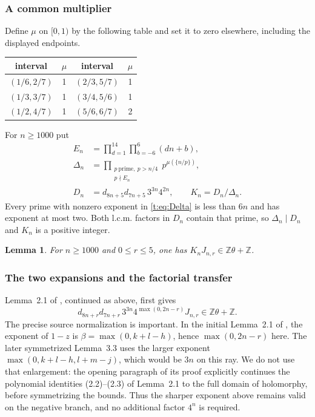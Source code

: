 \documentclass[11pt]{amsart}
\newcommand{\Z}{\mathbb Z}
\theoremstyle{plain}
\newtheorem{lemma}[theorem]{Lemma}
\theoremstyle{remark}\newtheorem{remark}[theorem]{Remark}
\numberwithin{equation}{section}
\begin{document}
\subsubsection{A common multiplier}
Define $\mu$ on $[0,1)$ by the following table and set it to zero elsewhere,
including the displayed endpoints.
\begin{center}
\begin{tabular}{cc@{\qquad}cc}
\toprule
interval & $\mu$ & interval & $\mu$\\
\midrule
$(1/6,2/7)$&1&$(2/3,5/7)$&1\\
$(1/3,3/7)$&1&$(3/4,5/6)$&1\\
$(1/2,4/7)$&1&$(5/6,6/7)$&2\\
\bottomrule
\end{tabular}
\end{center}
For $n\ge1000$ put
\begin{align}
 E_n&=\prod_{d=1}^{14}\prod_{b=-6}^{6}(dn+b),\label{t:eq:E}\\
 \Delta_n&=\prod_{\substack{p\ \mathrm{prime},\ p>n/4\\p\nmid E_n}}
       p^{\mu(\{n/p\})},\label{t:eq:Delta}\\
 D_n&=d_{8n+5}d_{7n+5}\,3^{3n}4^{2n},\qquad K_n=D_n/\Delta_n.
       \label{t:eq:K}
\end{align}
Every prime with nonzero exponent in \eqref{t:eq:Delta} is less than $6n$ and
has exponent at most two. Both l.c.m. factors in $D_n$ contain that prime,
so $\Delta_n\mid D_n$ and $K_n$ is a positive integer.

\begin{lemma}\label{t:lem:arithmetic}
For $n\ge1000$ and $0\le r\le5$, one has $K_nJ_{n,r}\in\Z\theta+\Z$.
\end{lemma}

\subsubsection{The two expansions and the factorial transfer}
Lemma~2.1 of \cite{VZ18}, continued as above, first gives
\[
 d_{8n+r}d_{7n+r}\,3^{3n}4^{\max(0,2n-r)}J_{n,r}\in\Z\theta+\Z.
\]
The precise source normalization is important. In the initial
Lemma~2.1 of \cite{VZ18}, the exponent of $1-z$ is
$\beta=\max(0,k+l-h)$, hence $\max(0,2n-r)$ here. The later symmetrized
Lemma~3.3 uses the larger exponent $\max(0,k+l-h,l+m-j)$, which would be
$3n$ on this ray. We do not use that enlargement: the opening paragraph of
its proof explicitly continues the polynomial identities (2.2)--(2.3) of
Lemma~2.1 to the full domain of holomorphy, before symmetrizing the bounds.
Thus the sharper exponent above remains valid on the negative branch, and
no additional factor $4^n$ is required.
\end{document}
